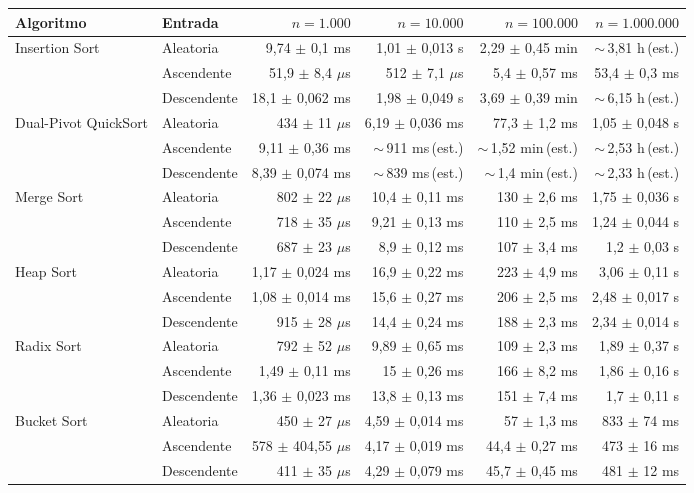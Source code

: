 {\scriptsize
\begin{tabular}{llrrrr}
\toprule
Algoritmo & Entrada & $n=1.000$ & $n=10.000$ & $n=100.000$ & $n=1.000.000$ \\
\midrule
Insertion Sort & Aleatoria & 9,74 $\pm$ 0,1 ms & 1,01 $\pm$ 0,013 s & 2,29 $\pm$ 0,45 min & $\sim$\,3,81 h\,(est.) \\
 & Ascendente & 51,9 $\pm$ 8,4 $\mu$s & 512 $\pm$ 7,1 $\mu$s & 5,4 $\pm$ 0,57 ms & 53,4 $\pm$ 0,3 ms \\
 & Descendente & 18,1 $\pm$ 0,062 ms & 1,98 $\pm$ 0,049 s & 3,69 $\pm$ 0,39 min & $\sim$\,6,15 h\,(est.) \\
Dual-Pivot QuickSort & Aleatoria & 434 $\pm$ 11 $\mu$s & 6,19 $\pm$ 0,036 ms & 77,3 $\pm$ 1,2 ms & 1,05 $\pm$ 0,048 s \\
 & Ascendente & 9,11 $\pm$ 0,36 ms & $\sim$\,911 ms\,(est.) & $\sim$\,1,52 min\,(est.) & $\sim$\,2,53 h\,(est.) \\
 & Descendente & 8,39 $\pm$ 0,074 ms & $\sim$\,839 ms\,(est.) & $\sim$\,1,4 min\,(est.) & $\sim$\,2,33 h\,(est.) \\
Merge Sort & Aleatoria & 802 $\pm$ 22 $\mu$s & 10,4 $\pm$ 0,11 ms & 130 $\pm$ 2,6 ms & 1,75 $\pm$ 0,036 s \\
 & Ascendente & 718 $\pm$ 35 $\mu$s & 9,21 $\pm$ 0,13 ms & 110 $\pm$ 2,5 ms & 1,24 $\pm$ 0,044 s \\
 & Descendente & 687 $\pm$ 23 $\mu$s & 8,9 $\pm$ 0,12 ms & 107 $\pm$ 3,4 ms & 1,2 $\pm$ 0,03 s \\
Heap Sort & Aleatoria & 1,17 $\pm$ 0,024 ms & 16,9 $\pm$ 0,22 ms & 223 $\pm$ 4,9 ms & 3,06 $\pm$ 0,11 s \\
 & Ascendente & 1,08 $\pm$ 0,014 ms & 15,6 $\pm$ 0,27 ms & 206 $\pm$ 2,5 ms & 2,48 $\pm$ 0,017 s \\
 & Descendente & 915 $\pm$ 28 $\mu$s & 14,4 $\pm$ 0,24 ms & 188 $\pm$ 2,3 ms & 2,34 $\pm$ 0,014 s \\
Radix Sort & Aleatoria & 792 $\pm$ 52 $\mu$s & 9,89 $\pm$ 0,65 ms & 109 $\pm$ 2,3 ms & 1,89 $\pm$ 0,37 s \\
 & Ascendente & 1,49 $\pm$ 0,11 ms & 15 $\pm$ 0,26 ms & 166 $\pm$ 8,2 ms & 1,86 $\pm$ 0,16 s \\
 & Descendente & 1,36 $\pm$ 0,023 ms & 13,8 $\pm$ 0,13 ms & 151 $\pm$ 7,4 ms & 1,7 $\pm$ 0,11 s \\
Bucket Sort & Aleatoria & 450 $\pm$ 27 $\mu$s & 4,59 $\pm$ 0,014 ms & 57 $\pm$ 1,3 ms & 833 $\pm$ 74 ms \\
 & Ascendente & 578 $\pm$ 404,55 $\mu$s & 4,17 $\pm$ 0,019 ms & 44,4 $\pm$ 0,27 ms & 473 $\pm$ 16 ms \\
 & Descendente & 411 $\pm$ 35 $\mu$s & 4,29 $\pm$ 0,079 ms & 45,7 $\pm$ 0,45 ms & 481 $\pm$ 12 ms \\
\bottomrule
\end{tabular}}\par
